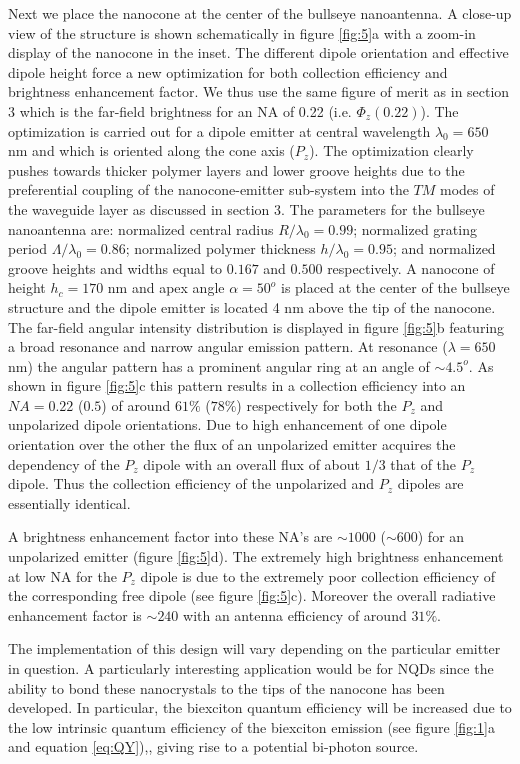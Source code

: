\documentclass[10pt,onecolumn ]{article}
\begin{document}
Next we place the nanocone at the center of the bullseye nanoantenna. 
A close-up view of the structure is shown schematically in figure \ref{fig:5}a with a zoom-in display of the nanocone in the inset.
The different dipole orientation and effective dipole height force a new optimization for both collection efficiency and brightness enhancement factor. 
We thus use the same figure of merit as in section 3 which is the far-field brightness for an NA of 0.22 (i.e. $\Phi_z(0.22)$). 
The optimization is carried out for a dipole emitter at central wavelength $\lambda_0 = 650$ nm and which is oriented along the cone axis ($P_z$).
The optimization clearly pushes towards thicker polymer layers and lower groove heights due to the preferential coupling of the nanocone-emitter sub-system into the $TM$ modes of the waveguide layer as discussed in section 3.
The parameters for the bullseye nanoantenna are: normalized central radius $R/\lambda_0 = 0.99 $; normalized grating period $\Lambda/\lambda_0 = 0.86$; normalized polymer thickness $h/\lambda_0 = 0.95$; and normalized groove heights and widths equal to $0.167$ and $0.500$ respectively.
A nanocone of height $h_c = 170$ nm and apex angle $\alpha=50^o$ is placed at the center of the bullseye structure and the dipole emitter is located 4 nm above the tip of the nanocone. 
The far-field angular intensity distribution is displayed in figure \ref{fig:5}b featuring a broad resonance and narrow angular emission pattern. 
At resonance ($\lambda=650$ nm) the angular pattern has a prominent angular ring at an angle of $\sim 4.5^o$.
As shown in figure \ref{fig:5}c this pattern results in a collection efficiency into an $NA=0.22$ ($0.5$)  of around $61 \%$ ($78 \%$) respectively for both the $P_z$ and unpolarized dipole orientations. 
Due to high enhancement of one dipole orientation over the other the flux of an unpolarized emitter acquires the dependency of the $P_z$ dipole with an overall flux of about $1/3$ that of the $P_z$ dipole.  
Thus the collection efficiency of the unpolarized and $P_z$ dipoles are essentially identical. 

A brightness enhancement factor into these NA's are $\sim1000$ ($\sim600$) for an unpolarized emitter (figure \ref{fig:5}d). The extremely high brightness enhancement at low NA for the $P_z$ dipole is due to the extremely poor collection efficiency of the corresponding free dipole (see figure \ref{fig:5}c).  
Moreover the overall radiative enhancement factor is $\sim 240$ with an antenna efficiency of around $31\%$.

The implementation of this design will vary depending on the particular emitter in question. 
A particularly interesting application would be for NQDs since the ability to bond these nanocrystals to the tips of the nanocone has been developed. \cite{Fulmes2015Self-alignedNanostructures,Meixner2015} In particular, the biexciton quantum efficiency will be increased due to the low intrinsic quantum efficiency of the biexciton emission (see figure \ref{fig:1}a and equation \ref{eq:QY}),\cite{Matsuzaki2017StrongAntenna}, giving rise to a potential bi-photon source.
\end{document}
